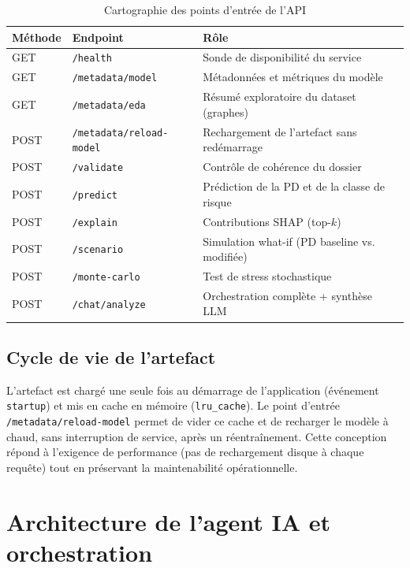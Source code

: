 \documentclass[a4paper,12pt,oneside]{report}
\begin{document}
\begin{table}[H]
\centering
\caption{Cartographie des points d'entrée de l'API}
\label{tab:endpoints}
\renewcommand{\arraystretch}{1.3}
\begin{tabularx}{\textwidth}{@{}l l Y@{}}
\toprule
\textbf{Méthode} & \textbf{Endpoint} & \textbf{Rôle} \\
\midrule
GET  & \texttt{/health}              & Sonde de disponibilité du service \\
GET  & \texttt{/metadata/model}      & Métadonnées et métriques du modèle \\
GET  & \texttt{/metadata/eda}        & Résumé exploratoire du dataset (graphes) \\
POST & \texttt{/metadata/reload-model} & Rechargement de l'artefact sans redémarrage \\
POST & \texttt{/validate}            & Contrôle de cohérence du dossier \\
POST & \texttt{/predict}             & Prédiction de la PD et de la classe de risque \\
POST & \texttt{/explain}             & Contributions SHAP (top-$k$) \\
POST & \texttt{/scenario}            & Simulation what-if (PD baseline vs. modifiée) \\
POST & \texttt{/monte-carlo}         & Test de stress stochastique \\
POST & \texttt{/chat/analyze}        & Orchestration complète + synthèse LLM \\
\bottomrule
\end{tabularx}
\end{table}

\subsection{Cycle de vie de l'artefact}

L'artefact est chargé une seule fois au démarrage de l'application
(événement \texttt{startup}) et mis en cache en mémoire (\texttt{lru\_cache}). Le
point d'entrée \texttt{/metadata/reload-model} permet de vider ce cache et de
recharger le modèle à chaud, sans interruption de service, après un réentraînement.
Cette conception répond à l'exigence de performance (pas de rechargement disque à
chaque requête) tout en préservant la maintenabilité opérationnelle.

\section{Architecture de l'agent IA et orchestration}
\end{document}
